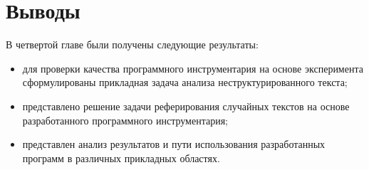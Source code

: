 \section{Выводы}

В четвертой главе были получены следующие результаты:
\begin{itemize}
\item для проверки качества программного инструментария на основе эксперимента  сформулированы прикладная задача анализа неструктурированного текста;
\item представлено  решение задачи реферирования случайных текстов на основе разработанного программного инструментария;
\item представлен анализ результатов и пути использования разработанных программ в различных прикладных областях. 
\end{itemize}
